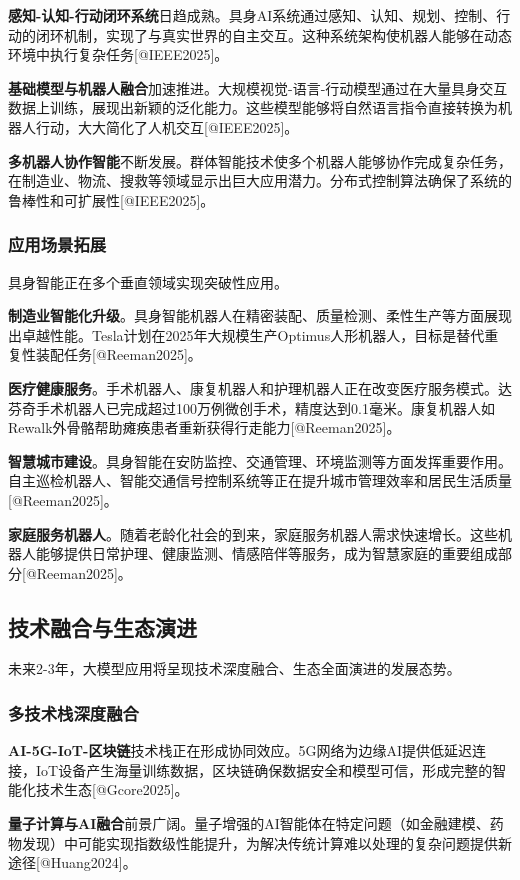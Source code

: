 \documentclass{article}
\begin{document}
\textbf{感知-认知-行动闭环系统}日趋成熟。具身AI系统通过感知、认知、规划、控制、行动的闭环机制，实现了与真实世界的自主交互。这种系统架构使机器人能够在动态环境中执行复杂任务[@IEEE2025]。

\textbf{基础模型与机器人融合}加速推进。大规模视觉-语言-行动模型通过在大量具身交互数据上训练，展现出新颖的泛化能力。这些模型能够将自然语言指令直接转换为机器人行动，大大简化了人机交互[@IEEE2025]。

\textbf{多机器人协作智能}不断发展。群体智能技术使多个机器人能够协作完成复杂任务，在制造业、物流、搜救等领域显示出巨大应用潜力。分布式控制算法确保了系统的鲁棒性和可扩展性[@IEEE2025]。

\subsubsection{应用场景拓展}
具身智能正在多个垂直领域实现突破性应用。

\textbf{制造业智能化升级}。具身智能机器人在精密装配、质量检测、柔性生产等方面展现出卓越性能。Tesla计划在2025年大规模生产Optimus人形机器人，目标是替代重复性装配任务[@Reeman2025]。

\textbf{医疗健康服务}。手术机器人、康复机器人和护理机器人正在改变医疗服务模式。达芬奇手术机器人已完成超过100万例微创手术，精度达到0.1毫米。康复机器人如Rewalk外骨骼帮助瘫痪患者重新获得行走能力[@Reeman2025]。

\textbf{智慧城市建设}。具身智能在安防监控、交通管理、环境监测等方面发挥重要作用。自主巡检机器人、智能交通信号控制系统等正在提升城市管理效率和居民生活质量[@Reeman2025]。

\textbf{家庭服务机器人}。随着老龄化社会的到来，家庭服务机器人需求快速增长。这些机器人能够提供日常护理、健康监测、情感陪伴等服务，成为智慧家庭的重要组成部分[@Reeman2025]。

\subsection{技术融合与生态演进}
未来2-3年，大模型应用将呈现技术深度融合、生态全面演进的发展态势。

\subsubsection{多技术栈深度融合}
\textbf{AI-5G-IoT-区块链}技术栈正在形成协同效应。5G网络为边缘AI提供低延迟连接，IoT设备产生海量训练数据，区块链确保数据安全和模型可信，形成完整的智能化技术生态[@Gcore2025]。

\textbf{量子计算与AI融合}前景广阔。量子增强的AI智能体在特定问题（如金融建模、药物发现）中可能实现指数级性能提升，为解决传统计算难以处理的复杂问题提供新途径[@Huang2024]。
\end{document}

